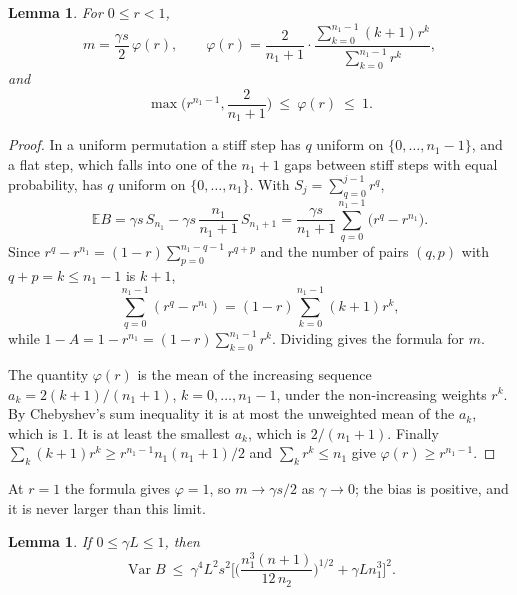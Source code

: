 \documentclass[11pt]{amsart}
\newtheorem{lemma}[theorem]{Lemma}
\theoremstyle{remark}\newtheorem{remark}[theorem]{Remark}
\newcommand{\E}{\mathbb{E}}
\newcommand{\Var}{\operatorname{Var}}
\begin{document}
\begin{lemma}\label{lem:mean}
For $0\le r<1$,
\[
m=\frac{\gamma s}{2}\,\varphi(r),\qquad \varphi(r)=\frac{2}{n_1+1}\cdot\frac{\sum_{k=0}^{n_1-1}(k+1)r^k}{\sum_{k=0}^{n_1-1}r^k},
\]
and
\[
\max\Big(r^{n_1-1},\frac{2}{n_1+1}\Big)\ \le\ \varphi(r)\ \le\ 1 .
\]
\end{lemma}

\begin{proof}
In a uniform permutation a stiff step has $q$ uniform on $\{0,\dots,n_1-1\}$, and a flat step, which falls into one of
the $n_1+1$ gaps between stiff steps with equal probability, has $q$ uniform on $\{0,\dots,n_1\}$. With
$S_j=\sum_{q=0}^{j-1}r^q$,
\[
\E B=\gamma s\,S_{n_1}-\gamma s\,\frac{n_1}{n_1+1}\,S_{n_1+1}=\frac{\gamma s}{n_1+1}\sum_{q=0}^{n_1-1}\big(r^q-r^{n_1}\big).
\]
Since $r^q-r^{n_1}=(1-r)\sum_{p=0}^{n_1-q-1}r^{q+p}$ and the number of pairs $(q,p)$ with $q+p=k\le n_1-1$ is $k+1$,
\[
\sum_{q=0}^{n_1-1}(r^q-r^{n_1})=(1-r)\sum_{k=0}^{n_1-1}(k+1)r^k,
\]
while $1-A=1-r^{n_1}=(1-r)\sum_{k=0}^{n_1-1}r^k$. Dividing gives the formula for $m$.

The quantity $\varphi(r)$ is the mean of the increasing sequence $a_k=2(k+1)/(n_1+1)$, $k=0,\dots,n_1-1$, under the
non-increasing weights $r^k$. By Chebyshev's sum inequality it is at most the unweighted mean of the $a_k$, which is
$1$. It is at least the smallest $a_k$, which is $2/(n_1+1)$. Finally
$\sum_k(k+1)r^k\ge r^{n_1-1}n_1(n_1+1)/2$ and $\sum_kr^k\le n_1$ give $\varphi(r)\ge r^{n_1-1}$.
\end{proof}

At $r=1$ the formula gives $\varphi=1$, so $m\to\gamma s/2$ as $\gamma\to0$; the bias is positive, and it is never
larger than this limit.

\begin{lemma}\label{lem:var}
If $0\le\gamma L\le1$, then
\[
\Var B\ \le\ \gamma^4L^2s^2\Big[\Big(\frac{n_1^3(n+1)}{12\,n_2}\Big)^{1/2}+\gamma Ln_1^3\Big]^2 .
\]
\end{lemma}
\end{document}

